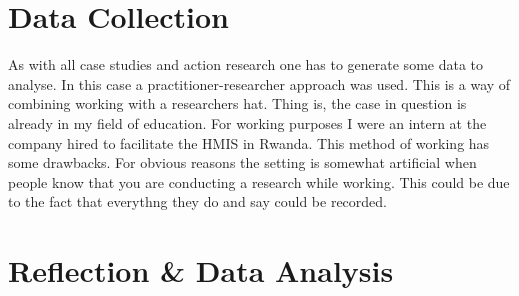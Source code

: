 \section{Data Collection}
As with all case studies and action research one has to generate some data to analyse.
In this case a practitioner-researcher approach was used\cite{13}. This is a way of combining working with a researchers hat.
Thing is, the case in question is already in my field of education. For working purposes I were an intern at the company hired to facilitate the HMIS in Rwanda.
This method of working has some drawbacks.
For obvious reasons the setting is somewhat artificial when people know that you are conducting a research while working.
This could be due to the fact that everythng they do and say could be recorded.
\section{Reflection \& Data Analysis}

